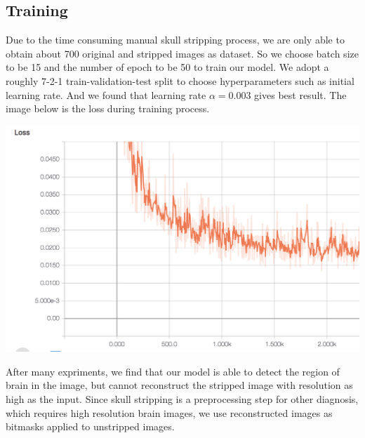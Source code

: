 \documentclass[conference]{IEEEtran}
\begin{document}
\subsection*{Training}
Due to the time consuming manual skull stripping process, we are only able to obtain about 700 original and stripped images as dataset. So we choose batch size to be 15 and the number of epoch to be 50 to train our model. We adopt a roughly 7-2-1 train-validation-test split to choose hyperparameters such as initial learning rate. And we found that learning rate $\alpha = 0.003$ gives best result. The image below is the loss during training process.\\
\begin{center}
    \includegraphics[scale=0.2]{loss.png}  
\end{center}

After many expriments, we find that our model is able to detect the region of brain in the image, but cannot reconstruct the stripped image with resolution as high as the input. Since skull stripping is a preprocessing step for other diagnosis, which requires high resolution brain images, we use reconstructed images as bitmasks applied to unstripped images.
\end{document}
